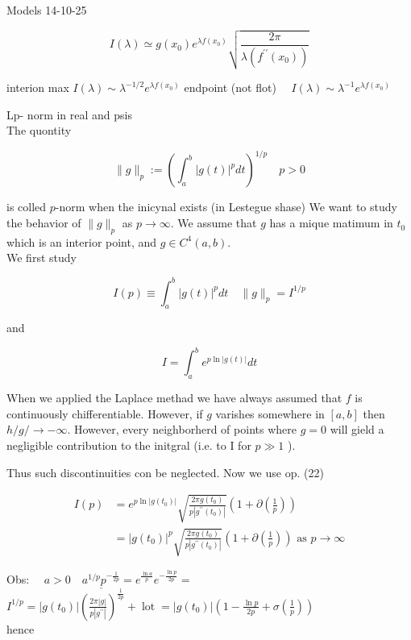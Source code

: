 \documentclass[10pt]{article}
\begin{document}
Models 14-10-25

$$
I(\lambda) \simeq g\left(x_{0}\right) e^{\lambda f\left(x_{0}\right)} \sqrt{\frac{2 \pi}{\lambda\left(f^{\prime \prime}\left(x_{0}\right)\right)}}
$$

interion max $I(\lambda) \sim \lambda^{-1 / 2} e^{\lambda f\left(x_{0}\right)}$ endpoint (not flot) $\quad I(\lambda) \sim \lambda^{-1} e^{\lambda f\left(x_{0}\right)}$

Lp- norm in real and psis\\
The quontity

$$
\|g\|_{p}:=\left(\int_{a}^{b}|g(t)|^{p} d t\right)^{1 / p} \quad p>0
$$

is colled $p$-norm when the inicynal exists (in Lestegue shase) We want to study the behavior of $\|g\|_{p}$ as $p \rightarrow \infty$. We assume that $g$ has a mique matimum in $t_{0}$ which is an interior point, and $g \in C^{4}(a, b)$.\\
We first study

$$
I(p) \equiv \int_{a}^{b}|g(t)|^{p} d t \quad\|g\|_{p}=I^{1 / p}
$$

and

$$
I=\int_{a}^{b} e^{p \ln |g(t)|} d t
$$

When we applied the Laplace methad we have always assumed that $f$ is continuously chifferentiable. However, if $g$ varishes somewhere in $[a, b]$ then $h / g / \rightarrow-\infty$. However, every neighborherd of points where $g=0$ will gield a negligible contribution to the initgral (i.e. to I for $p \gg 1$ ).

Thus such discontinuities con be neglected. Now we use op. (22)

$$
\begin{aligned}
I(p) & =e^{p \ln \left|g\left(t_{0}\right)\right|} \sqrt{\frac{2 \pi g\left(t_{0}\right)}{p\left|g^{\prime \prime}\left(t_{0}\right)\right|}}\left(1+\partial\left(\frac{1}{p}\right)\right) \\
& =\left|g\left(t_{0}\right)\right|^{p} \sqrt{\frac{2 \pi g\left(t_{0}\right)}{p\left|g^{\prime \prime}\left(t_{0}\right)\right|}}\left(1+\partial\left(\frac{1}{p}\right)\right) \text { as } p \rightarrow \infty
\end{aligned}
$$

Obs: $\quad a>0 \quad \underline{a^{1 / p} p^{-\frac{1}{2 p}}}=e^{\frac{\ln a}{p}} e^{-\frac{\ln p}{2 p}}=$\\
$I^{1 / p}=\left|g\left(t_{0}\right)\right|\left(\frac{2 \pi|g|}{p\left|g^{\prime \prime}\right|}\right)^{\frac{1}{2 p}}+\operatorname{lot}=\left|g\left(t_{0}\right)\right|\left(1-\frac{\ln p}{2 p}+\sigma\left(\frac{1}{p}\right)\right)$\\
hence
\end{document}
